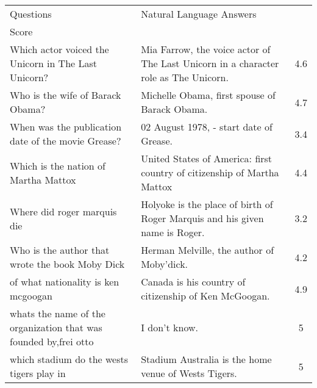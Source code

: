 \begin{landscape}
\begin{longtable}[c]{@{}llc@{}}
\toprule
Questions                                                        & Natural Language Answers                                                            & \begin{tabular}[c]{@{}c@{}}Avg. \\ Score\end{tabular} \\* \midrule
\endhead
%
\bottomrule
\endfoot
%
\endlastfoot
%
Which actor voiced the Unicorn in The Last Unicorn?              & Mia Farrow, the voice actor of The Last Unicorn in a character role as The Unicorn. & 4.6                                                   \\
Who is the wife of Barack Obama?                                 & Michelle Obama, first spouse of Barack Obama.                                       & 4.7                                                   \\
When was the publication date of the movie Grease?               & 02 August 1978, - start date of Grease.                                             & 3.4                                                   \\
Which is the nation of Martha Mattox                             & United States of America: first country of citizenship of Martha Mattox             & 4.4                                                   \\
Where did roger marquis die                                      & Holyoke is the place of birth of Roger Marquis and his given name is Roger.         & 3.2                                                   \\
Who is the author that wrote the book Moby Dick                  & Herman Melville, the author of Moby'dick.                                           & 4.2                                                   \\
of what nationality is ken mcgoogan                              & Canada is his country of citizenship of Ken McGoogan.                               & 4.9                                                   \\
whats the name of the organization that was founded by,frei otto & I don't know.                                                                       & 5                                                     \\
which stadium do the wests tigers play in                        & Stadium Australia is the home venue of Wests Tigers.                                & 5                                                     \\

\end{longtable}
\end{landscape}
